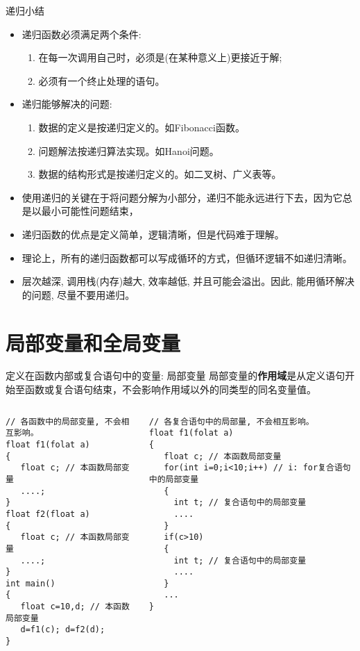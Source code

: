 \begin{frame}{递归小结}
\vspace{-0.4cm}
\begin{itemize}
	\item 递归函数必须满足两个条件:
	\begin{enumerate}
		\item 在每一次调用自己时，必须是(在某种意义上)更接近于解;
		\item 必须有一个终止处理的语句。
	\end{enumerate}
    \item 递归能够解决的问题:
    \begin{enumerate}
    	\item 数据的定义是按递归定义的。如Fibonacci函数。
    	\item 问题解法按递归算法实现。如Hanoi问题。
    	\item 数据的结构形式是按递归定义的。如二叉树、广义表等。
    \end{enumerate}
	\item 使用递归的关键在于将问题分解为小部分，递归不能永远进行下去，因为它总是以最小可能性问题结束，
	\item 递归函数的优点是定义简单，逻辑清晰，但是代码难于理解。
	\item 理论上，所有的递归函数都可以写成循环的方式，但循环逻辑不如递归清晰。
	\item 层次越深, 调用栈(内存)越大, 效率越低, 并且可能会溢出。因此, 能用循环解决的问题, 尽量不要用递归。
\end{itemize}
\end{frame}

\section{局部变量和全局变量}

\begin{frame}{定义在函数内部或复合语句中的变量: 局部变量}
局部变量的\textbf{作用域}是从定义语句开始至函数或复合语句结束，不会影响作用域以外的同类型的同名变量值。 
\vspace{-0.3cm}
\begin{columns}[T]
\begin{lstlisting}
// 各函数中的局部变量, 不会相互影响。
float f1(folat a) 
{
   float c; // 本函数局部变量
   ....;
}
float f2(float a)
{ 
   float c; // 本函数局部变量
   ....;
}
int main()
{
   float c=10,d; // 本函数局部变量
   d=f1(c); d=f2(d);
}
\end{lstlisting}
\begin{lstlisting}[frame=leftline]
// 各复合语句中的局部量, 不会相互影响。
float f1(folat a) 
{
   float c; // 本函数局部变量
   for(int i=0;i<10;i++) // i: for复合语句中的局部变量
   {
     int t; // 复合语句中的局部变量 
     ....
   }
   if(c>10)
   {
     int t; // 复合语句中的局部变量 
     ....
   }
   ...
}
\end{lstlisting}
\end{columns}
~\\
\end{frame}

